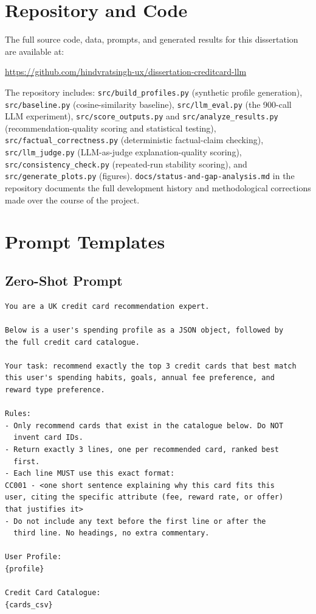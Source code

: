 \appendix

\chapter{Repository and Code}
\label{app:code}

The full source code, data, prompts, and generated results for this dissertation are available at:

\begin{center}
\url{https://github.com/hindvratsingh-ux/dissertation-creditcard-llm}
\end{center}

The repository includes: \texttt{src/build\_profiles.py} (synthetic profile generation), \texttt{src/baseline.py} (cosine-similarity baseline), \texttt{src/llm\_eval.py} (the 900-call LLM experiment), \texttt{src/score\_outputs.py} and \texttt{src/analyze\_results.py} (recommendation-quality scoring and statistical testing), \texttt{src/factual\_correctness.py} (deterministic factual-claim checking), \texttt{src/llm\_judge.py} (LLM-as-judge explanation-quality scoring), \texttt{src/consistency\_check.py} (repeated-run stability scoring), and \texttt{src/generate\_plots.py} (figures). \texttt{docs/status-and-gap-analysis.md} in the repository documents the full development history and methodological corrections made over the course of the project.

\chapter{Prompt Templates}
\label{app:prompts}

\section{Zero-Shot Prompt}
\begin{verbatim}
You are a UK credit card recommendation expert.

Below is a user's spending profile as a JSON object, followed by
the full credit card catalogue.

Your task: recommend exactly the top 3 credit cards that best match
this user's spending habits, goals, annual fee preference, and
reward type preference.

Rules:
- Only recommend cards that exist in the catalogue below. Do NOT
  invent card IDs.
- Return exactly 3 lines, one per recommended card, ranked best
  first.
- Each line MUST use this exact format:
CC001 - <one short sentence explaining why this card fits this
user, citing the specific attribute (fee, reward rate, or offer)
that justifies it>
- Do not include any text before the first line or after the
  third line. No headings, no extra commentary.

User Profile:
{profile}

Credit Card Catalogue:
{cards_csv}
\end{verbatim}


